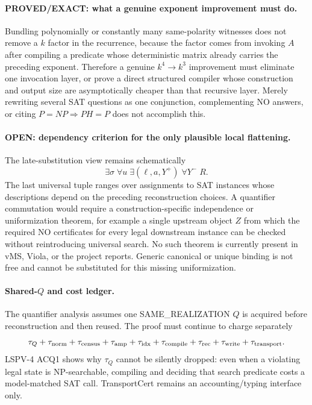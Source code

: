 \documentclass[11pt]{article}
\begin{document}
\paragraph{PROVED/EXACT: what a genuine exponent improvement must do.}
Bundling polynomially or constantly many same-polarity witnesses does not remove a $k$ factor in the recurrence, because the factor comes from invoking $A$ after compiling a predicate whose deterministic matrix already carries the preceding exponent. Therefore a genuine $k^4\to k^3$ improvement must eliminate one invocation layer, or prove a direct structured compiler whose construction and output size are asymptotically cheaper than that recursive layer. Merely rewriting several SAT questions as one conjunction, complementing NO answers, or citing $P=NP\Rightarrow PH=P$ does not accomplish this.

\paragraph{OPEN: dependency criterion for the only plausible local flattening.}
The late-substitution view remains schematically
\[
\boxed{
\exists\sigma\;\forall u\;\exists(\ell,a,Y^+)\;\forall Y^-\;R.
}
\]
The last universal tuple ranges over assignments to SAT instances whose descriptions depend on the preceding reconstruction choices. A quantifier commutation would require a construction-specific independence or uniformization theorem, for example a single upstream object $Z$ from which the required NO certificates for every legal downstream instance can be checked without reintroducing universal search. No such theorem is currently present in vMS, Viola, or the project reports. Generic canonical or unique binding is not free and cannot be substituted for this missing uniformization.

\paragraph{Shared-$Q$ and cost ledger.}
The quantifier analysis assumes one SAME\_REALIZATION $Q$ is acquired before reconstruction and then reused. The proof must continue to charge separately
\[
\tau_Q+\tau_{\rm norm}+\tau_{\rm census}+\tau_{\rm amp}+\tau_{\rm idx}
+\tau_{\rm compile}+\tau_{\rm rec}+\tau_{\rm write}+\tau_{\rm transport}.
\]
LSPV-4 ACQ1 shows why $\tau_Q$ cannot be silently dropped: even when a violating legal state is NP-searchable, compiling and deciding that search predicate costs a model-matched SAT call. TransportCert remains an accounting/typing interface only.
\end{document}
